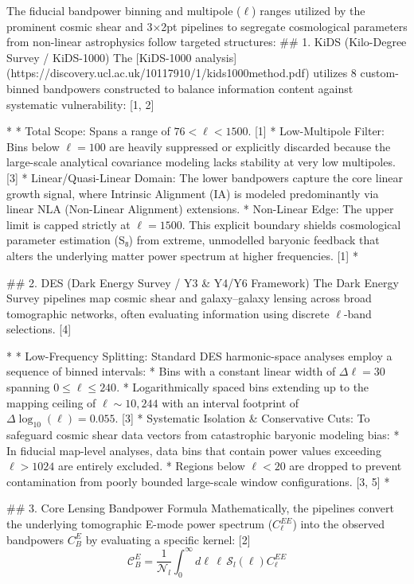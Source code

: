 The fiducial bandpower binning and multipole ($\ell$) ranges utilized by the prominent cosmic shear and 3×2pt pipelines to segregate cosmological parameters from non-linear astrophysics follow targeted structures:
## 1. KiDS (Kilo-Degree Survey / KiDS-1000)
The [KiDS-1000 analysis](https://discovery.ucl.ac.uk/10117910/1/kids1000method.pdf) utilizes 8 custom-binned bandpowers constructed to balance information content against systematic vulnerability: [1, 2] 

* 
* Total Scope: Spans a range of $76 < \ell < 1500$. [1] 
* Low-Multipole Filter: Bins below $\ell = 100$ are heavily suppressed or explicitly discarded because the large-scale analytical covariance modeling lacks stability at very low multipoles. [3] 
* Linear/Quasi-Linear Domain: The lower bandpowers capture the core linear growth signal, where Intrinsic Alignment (IA) is modeled predominantly via linear NLA (Non-Linear Alignment) extensions.
* Non-Linear Edge: The upper limit is capped strictly at $\ell = 1500$. This explicit boundary shields cosmological parameter estimation (S₈) from extreme, unmodelled baryonic feedback that alters the underlying matter power spectrum at higher frequencies. [1] 
* 

## 2. DES (Dark Energy Survey / Y3 & Y4/Y6 Framework)
The Dark Energy Survey pipelines map cosmic shear and galaxy–galaxy lensing across broad tomographic networks, often evaluating information using discrete $\ell$-band selections. [4] 

* 
* Low-Frequency Splitting: Standard DES harmonic-space analyses employ a sequence of binned intervals:
* Bins with a constant linear width of $\Delta \ell = 30$ spanning $0 \le \ell \le 240$.
   * Logarithmically spaced bins extending up to the mapping ceiling of $\ell \sim 10,244$ with an interval footprint of $\Delta \log_{10}(\ell) = 0.055$. [3] 
* Systematic Isolation & Conservative Cuts: To safeguard cosmic shear data vectors from catastrophic baryonic modeling bias:
* In fiducial map-level analyses, data bins that contain power values exceeding $\ell > 1024$ are entirely excluded.
   * Regions below $\ell < 20$ are dropped to prevent contamination from poorly bounded large-scale window configurations. [3, 5] 
* 

## 3. Core Lensing Bandpower Formula
Mathematically, the pipelines convert the underlying tomographic E-mode power spectrum ($C_{\ell}^{EE}$) into the observed bandpowers $C_{B}^{E}$ by evaluating a specific kernel: [2] 
$$\mathcal{C}_{B}^{E} = \frac{1}{\mathcal{N}_l} \int_{0}^{\infty} d\ell \, \ell \, \mathcal{S}_l(\ell) C_{\ell}^{EE}$$ 

